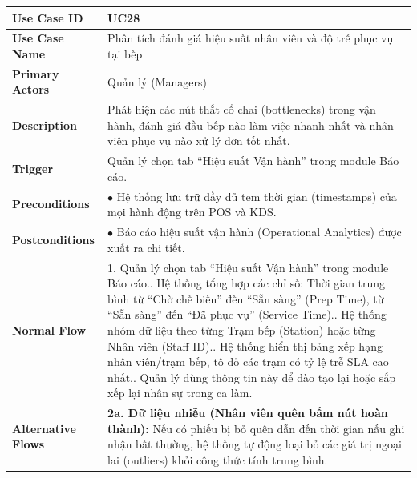 \begin{longtable}{|p{3.5cm}|p{12.5cm}|}
\hline
\textbf{Use Case ID} & UC28 \\ \hline
\textbf{Use Case Name} & Phân tích đánh giá hiệu suất nhân viên và độ trễ phục vụ tại bếp \\ \hline
\textbf{Primary Actors} & Quản lý (Managers) \\ \hline
\textbf{Description} & Phát hiện các nút thắt cổ chai (bottlenecks) trong vận hành, đánh giá đầu bếp nào làm việc nhanh nhất và nhân viên phục vụ nào xử lý đơn tốt nhất. \\ \hline
\textbf{Trigger} & Quản lý chọn tab ``Hiệu suất Vận hành'' trong module Báo cáo. \\ \hline
\textbf{Preconditions} & $\bullet$ Hệ thống lưu trữ đầy đủ tem thời gian (timestamps) của mọi hành động trên POS và KDS. \\ \hline
\textbf{Postconditions} & $\bullet$ Báo cáo hiệu suất vận hành (Operational Analytics) được xuất ra chi tiết. \\ \hline
\textbf{Normal Flow} &
1. Quản lý chọn tab ``Hiệu suất Vận hành'' trong module Báo cáo.\newline
2. Hệ thống tổng hợp các chỉ số: Thời gian trung bình từ ``Chờ chế biến'' đến ``Sẵn sàng'' (Prep Time), từ ``Sẵn sàng'' đến ``Đã phục vụ'' (Service Time).\newline
3. Hệ thống nhóm dữ liệu theo từng Trạm bếp (Station) hoặc từng Nhân viên (Staff ID).\newline
4. Hệ thống hiển thị bảng xếp hạng nhân viên/trạm bếp, tô đỏ các trạm có tỷ lệ trễ SLA cao nhất.\newline
5. Quản lý dùng thông tin này để đào tạo lại hoặc sắp xếp lại nhân sự trong ca làm. \\ \hline
\textbf{Alternative Flows} &
\textbf{2a. Dữ liệu nhiễu (Nhân viên quên bấm nút hoàn thành):} Nếu có phiếu bị bỏ quên dẫn đến thời gian nấu ghi nhận bất thường, hệ thống tự động loại bỏ các giá trị ngoại lai (outliers) khỏi công thức tính trung bình. \\ \hline
\end{longtable}

